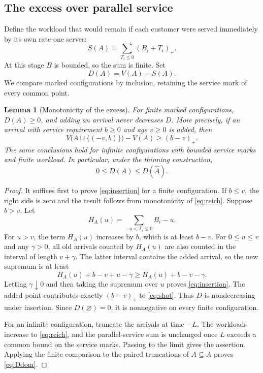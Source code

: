 \documentclass[11pt,reqno]{amsart}
\numberwithin{equation}{section}
\theoremstyle{plain}
\newtheorem{lemma}[theorem]{Lemma}
\theoremstyle{definition}
\newcommand{\1}{\mathbf 1}
\begin{document}
\subsection{The excess over parallel service}
Define the workload that would remain if each customer were served immediately by its own rate-one server:
\begin{equation}\label{eq:shot}
 S(A)=\sum_{T_i\le0}(B_i+T_i)_+.
\end{equation}
At this stage $B$ is bounded, so the sum is finite. Set
\begin{equation}\label{eq:D}
 D(A)=V(A)-S(A).
\end{equation}
We compare marked configurations by inclusion, retaining the service mark of every common point.

\begin{lemma}[Monotonicity of the excess]\label{lem:excess}
For finite marked configurations, $D(A)\ge0$, and adding an arrival never decreases $D$. More precisely, if an arrival with service requirement $b\ge0$ and age $v\ge0$ is added, then
\begin{equation}\label{eq:insertion}
 V\bigl(A\cup\{(-v,b)\}\bigr)-V(A)\ge(b-v)_+.
\end{equation}
The same conclusions hold for infinite configurations with bounded service marks and finite workload. In particular, under the thinning construction,
\begin{equation}\label{eq:Ddom}
 0\le D(A)\le D(\widehat A).
\end{equation}
\end{lemma}
\begin{proof}
It suffices first to prove \eqref{eq:insertion} for a finite configuration. If $b\le v$, the right side is zero and the result follows from monotonicity of \eqref{eq:reich}. Suppose $b>v$. Let
\[
 H_A(u)=\sum_{-u<T_i\le0}B_i-u.
\]
For $u>v$, the term $H_A(u)$ increases by $b$, which is at least $b-v$. For $0\le u\le v$ and any $\gamma>0$, all old arrivals counted by $H_A(u)$ are also counted in the interval of length $v+\gamma$. The latter interval contains the added arrival, so the new supremum is at least
\[
 H_A(u)+b-v+u-\gamma\ge H_A(u)+b-v-\gamma.
\]
Letting $\gamma\downarrow0$ and then taking the supremum over $u$ proves \eqref{eq:insertion}. The added point contributes exactly $(b-v)_+$ to \eqref{eq:shot}. Thus $D$ is nondecreasing under insertion. Since $D(\varnothing)=0$, it is nonnegative on every finite configuration.

For an infinite configuration, truncate the arrivals at time $-L$. The workloads increase to \eqref{eq:reich}, and the parallel-service sum is unchanged once $L$ exceeds a common bound on the service marks. Passing to the limit gives the assertion. Applying the finite comparison to the paired truncations of $A\subseteq\widehat A$ proves \eqref{eq:Ddom}.
\end{proof}
\end{document}
